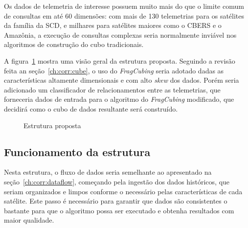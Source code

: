 Os dados de telemetria de interesse possuem muito mais do que o limite comum de consultas em até 60 dimensões: com mais de 130 telemetrias para os satélites da família da SCD, e milhares para satélites maiores como o CBERS e o Amazônia, a execução de consultas complexas seria normalmente inviável nos algoritmos de construção do cubo tradicionais.

A figura~\ref{fig:qualistructure} mostra uma visão geral da estrutura proposta.
Seguindo a revisão feita an seção~\ref{ch:corr:cube}, o uso do \textit{FragCubing} seria adotado dadas as características altamente dimensionais e com alto \textit{skew} dos dados.
Porém seria adicionado um classificador de relacionamentos entre as telemetrias, que forneceria dados de entrada para o algoritmo do \textit{FragCubing} modificado, que decidirá como o cubo de dados resultante será construído.

\begin{figure}[!htb]
	\caption{Estrutura proposta}\label{fig:qualistructure}
	\vspace{2mm}
	\begin{center}
	\end{center}
	\vspace{1mm}
	\legenda{}
\end{figure}

\subsection{Funcionamento da estrutura}\label{ch:prop:cube:func}

Nesta estrutura, o fluxo de dados seria semelhante ao apresentado na seção~\ref{ch:corr:dataflow}, começando pela ingestão dos dados históricos, que seriam organizados e limpos conforme o necessário pelas características de cada satélite.
Este passo é necessário para garantir que dados são consistentes o bastante para que o algoritmo possa ser executado e obtenha resultados com maior qualidade.

